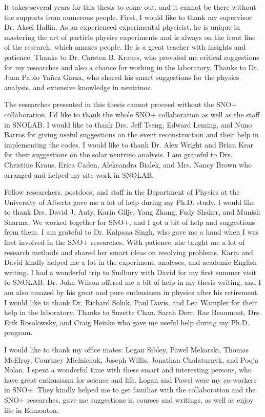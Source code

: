 It takes several years for this thesis to come out, and it cannot be there without the supports from numerous people. First, I would like to thank my supervisor Dr. Aksel Hallin. As an experienced experimental physicist, he is unique in mastering the art of particle physics experiments and is always on the front line of the research, which amazes people. He is a great teacher with insights and patience. Thanks to Dr. Carsten B. Krauss, who provided me critical suggestions for my researches and also a chance for working in the laboratory. Thanks to Dr. Juan Pablo Ya\~{n}ez Garza, who shared his smart suggestions for the physics analysis, and extensive knowledge in neutrinos. 

The researches presented in this thesis cannot proceed without the SNO+ collaboration. I'd like to thank the whole SNO+ collaboration as well as the staff in SNOLAB. I would like to thank Drs. Jeff Tseng, Edward Leming, and Nuno Barros for giving useful suggestions on the event reconstruction and their help in implementing the codes. I would like to thank Dr. Alex Wright and Brian Krar for their suggestions on the solar neutrino analysis. I am grateful to Drs. Christine Kraus, Erica Caden, Aleksandra Bialek, and Mrs. Nancy Brown who arranged and helped my site work in SNOLAB.

Fellow researchers, postdocs, and staff in the Department of Physics at the University of Alberta gave me a lot of help during my Ph.D. study. I would like to thank Drs. David J. Auty, Karin Gilje, Yang Zhang, Fady Shaker, and Munish Sharma. We worked together for SNO+, and I got a bit of help and suggestions from them. I am grateful to Dr. Kalpana Singh, who gave me a hand when I was first involved in the SNO+ researches. With patience, she taught me a lot of research methods and shared her smart ideas on resolving problems. Karin and David kindly helped me a lot in the experiment, analyses, and academic English writing. I had a wonderful trip to Sudbury with David for my first summer visit to SNOLAB. Dr. John Wilson offered me a bit of help in my thesis writing, and I am also amazed by his great and pure enthusiasm in physics after his retirement. I would like to thank Dr. Richard Soluk, Paul Davis, and Len Wampler for their help in the laboratory. Thanks to Suzette Chan, Sarah Derr, Rae Beaumont, Drs. Erik Rosolowsky, and Craig Heinke who gave me useful help during my Ph.D. program.

I would like to thank my office mates: Logan Sibley, Pawel Mekarski, Thomas McElroy, Courtney Mielnichuk, Joseph Willis, Jonathan Chalaturnyk, and Pooja Nolan. I spent a wonderful time with these smart and interesting persons, who have great enthusiasm for science and life. Logan and Pawel were my co-workers in SNO+. They kindly helped me to get familiar with the collaboration and the SNO+ researches, gave me suggestions in courses and writings, as well as enjoy life in Edmonton.

